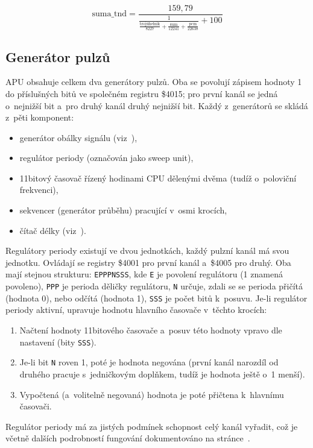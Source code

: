 \[\textrm{suma\_tnd} = \frac{159,79}{\frac{1}{\frac{\textrm{trojúhelnik}}{8227} + \frac{\textrm{šum}}{12241} + \frac{\textrm{pcm}}{22638}} + 100}\]

\subsection{Generátor pulzů}
APU obsahuje celkem dva generátory pulzů. Oba se povolují zápisem hodnoty 1 do příslušných bitů ve společném registru \$4015; pro první kanál se jedná o~nejnižší bit a~pro druhý kanál druhý nejnižší bit. Každý z~generátorů se skládá z~pěti komponent:
\begin{itemize}
	\item generátor obálky signálu (viz~\cite{Nesdev:apu-envelope}),
	\item regulátor periody (označován jako sweep unit),
	\item 11bitový časovač řízený hodinami CPU dělenými dvěma (tudíž o~poloviční frekvenci),
	\item sekvencer (generátor průběhu) pracující v~osmi krocích,
	\item čítač délky (viz~\cite{Nesdev:apu-length-counter}).
\end{itemize}

Regulátory periody existují ve dvou jednotkách, každý pulzní kanál má svou jednotku. Ovládají se registry \$4001 pro první kanál a~\$4005 pro druhý. Oba mají stejnou strukturu: \texttt{EPPPNSSS}, kde \texttt{E} je povolení regulátoru (1 znamená povoleno), \texttt{PPP} je perioda děličky regulátoru, \texttt{N} určuje, zdali se se perioda přičítá (hodnota 0), nebo odčítá (hodnota 1), \texttt{SSS} je počet bitů k~posuvu. Je-li regulátor periody aktivní, upravuje hodnotu hlavního časovače v~těchto krocích:
\begin{enumerate}
	\item Načtení hodnoty 11bitového časovače a~posuv této hodnoty vpravo dle nastavení (bity \texttt{SSS}).
	\item Je-li bit \texttt{N} roven 1, poté je hodnota negována (první kanál narozdíl od druhého pracuje s~jedničkovým doplňkem, tudíž je hodnota ještě o~1 menší).
	\item Vypočtená (a~volitelně negovaná) hodnota je poté přičtena k~hlavnímu časovači.
\end{enumerate}

Regulátor periody má za jistých podmínek schopnost celý kanál vyřadit, což je včetně dalších podrobností fungování dokumentováno na stránce~\cite{Nesdev:apu-sweep}.

